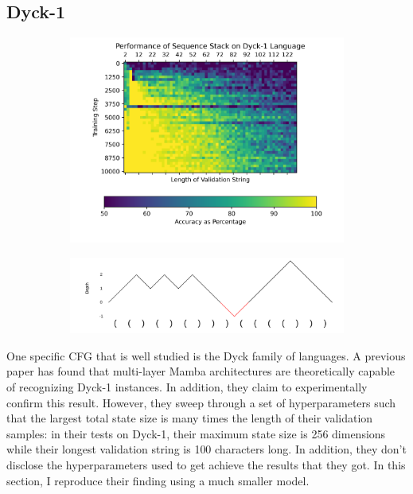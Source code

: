 \subsection{Dyck-1}
\begin{figure}
    \begin{subfigure}{0.5\textwidth}
        \includegraphics[width=\textwidth]{figures/dyck.png}
        \caption{}
        \label{resultsdyck}
    \end{subfigure}\begin{subfigure}{0.5\textwidth}
        \includegraphics[width=\textwidth]{figures/dyck_challenge.pdf}
        \caption{}
        \label{dyckchallenge}
    \end{subfigure}
    \caption{}
\end{figure}

One specific CFG that is well studied is the Dyck family of languages.
A previous paper\cite{ssmformal} has found that multi-layer Mamba architectures
are theoretically capable of recognizing Dyck-1 instances. In addition, they
claim to experimentally confirm this result. However, they sweep through a set
of hyperparameters such that the largest total state size is many times the
length of their validation samples: in their tests on Dyck-1, their maximum
state size is 256 dimensions while their longest validation string is 100
characters long. In addition, they don't disclose the hyperparameters used to
get achieve the results that they got.
In this section, I reproduce their finding using a much smaller model.

